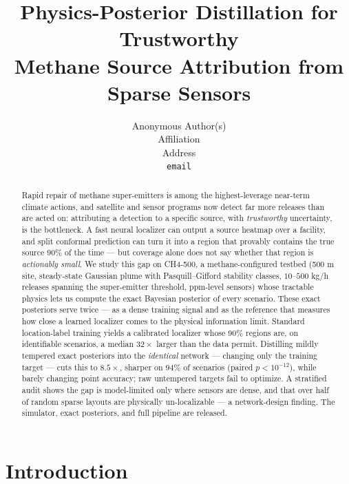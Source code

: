 \documentclass{article}
\title{Physics-Posterior Distillation for Trustworthy\\
Methane Source Attribution from Sparse Sensors}
\author{%
  Anonymous Author(s)\\
  Affiliation\\
  Address\\
  \texttt{email}
}
\begin{document}
\maketitle

\begin{abstract}
Rapid repair of methane super-emitters is among the highest-leverage near-term climate
actions, and satellite and sensor programs now detect far more releases than are acted on:
attributing a detection to a specific source, with \emph{trustworthy} uncertainty, is the
bottleneck. A fast neural localizer can output a source heatmap over a facility, and split
conformal prediction can turn it into a region that provably contains the true source
$90\%$ of the time --- but coverage alone does not say whether that region is
\emph{actionably small}. We study this gap on CH4-500, a methane-configured testbed
(500 m site, steady-state Gaussian plume with Pasquill--Gifford stability classes,
$10$--$500$ kg/h releases spanning the super-emitter threshold, ppm-level sensors) whose
tractable physics lets us compute the exact Bayesian posterior of every scenario. These
exact posteriors serve twice --- as a dense training signal and as the reference that
measures how close a learned localizer comes to the physical information limit. Standard
location-label training yields a calibrated localizer whose $90\%$ regions are, on
identifiable scenarios, a median $32\times$ larger than the data permit. Distilling
mildly tempered exact posteriors into the \emph{identical} network --- changing only the
training target --- cuts this to $8.5\times$, sharper on $94\%$ of scenarios
(paired $p < 10^{-12}$), while barely changing point accuracy; raw untempered targets
fail to optimize. A stratified audit shows the gap is model-limited only where sensors
are dense, and that over half of random sparse layouts are physically un-localizable ---
a network-design finding. The simulator, exact posteriors, and full pipeline are released.
\end{abstract}

\section{Introduction}
\end{document}
